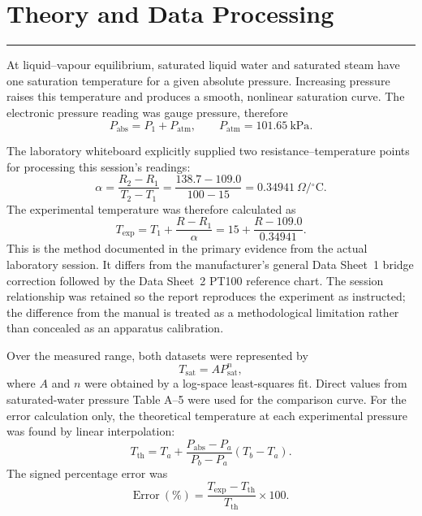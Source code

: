 \documentclass[11pt,a4paper]{article}
\newcommand{\sectionrule}{\vspace{-2pt}\color{rulegray}\hrule\color{black}\vspace{5pt}}
\begin{document}
\section{Theory and Data Processing}
\sectionrule
At liquid--vapour equilibrium, saturated liquid water and saturated steam have
one saturation temperature for a given absolute pressure. Increasing pressure
raises this temperature and produces a smooth, nonlinear saturation curve.
The electronic pressure reading was gauge pressure, therefore
\begin{equation}
  P_{\mathrm{abs}}=P_1+P_{\mathrm{atm}},
  \qquad P_{\mathrm{atm}}=\SI{101.65}{\kilo\pascal}.
  \label{eq:pressure}
\end{equation}

The laboratory whiteboard explicitly supplied two resistance--temperature
points for processing this session's readings:
\begin{equation}
 \alpha=\frac{R_2-R_1}{T_2-T_1}
 =\frac{138.7-109.0}{100-15}
 =0.34941~\Omega/{}^\circ\mathrm{C}.
 \label{eq:session-calibration}
\end{equation}
The experimental temperature was therefore calculated as
\begin{equation}
 T_{\mathrm{exp}}=T_1+\frac{R-R_1}{\alpha}
 =15+\frac{R-109.0}{0.34941}.
 \label{eq:pt100}
\end{equation}
This is the method documented in the primary evidence from the actual laboratory
session. It differs from the manufacturer's general Data Sheet~1 bridge
correction followed by the Data Sheet~2 PT100 reference chart. The session
relationship was retained so the report reproduces the experiment as instructed;
the difference from the manual is treated as a methodological limitation rather
than concealed as an apparatus calibration.

Over the measured range, both datasets were represented by
\begin{equation}
  T_{\mathrm{sat}}=AP_{\mathrm{sat}}^n,
  \label{eq:power}
\end{equation}
where $A$ and $n$ were obtained by a log-space least-squares fit. Direct values
from saturated-water pressure Table A--5 were used for the comparison curve.
For the error calculation only, the theoretical temperature at each
experimental pressure was found by linear interpolation:
\begin{equation}
  T_{\mathrm{th}}=T_a+\frac{P_{\mathrm{abs}}-P_a}{P_b-P_a}(T_b-T_a).
  \label{eq:interpolation}
\end{equation}
The signed percentage error was
\begin{equation}
  \mathrm{Error}\ (\%)=\frac{T_{\mathrm{exp}}-T_{\mathrm{th}}}
  {T_{\mathrm{th}}}\times100.
  \label{eq:error}
\end{equation}
\end{document}
